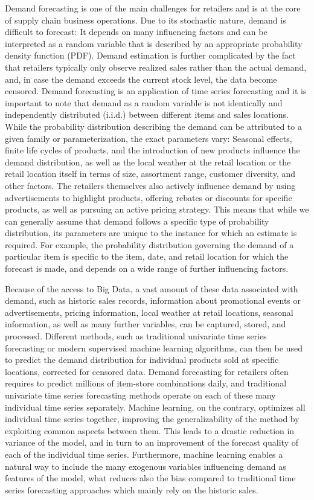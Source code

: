 \documentclass[BCOR=1mm, DIV=calc,10pt,
twoside=true,
twocolumn,
headings=normal]{scrartcl}
\begin{document}
Demand forecasting is one of the main challenges for retailers and is at the core of supply chain business operations. Due to its stochastic nature, demand is difficult to forecast: It depends on many influencing factors and can be interpreted as a random variable that is described by an appropriate probability density function (PDF). Demand estimation is further complicated by the fact that retailers typically only observe realized sales rather than the actual demand, and, in case the demand exceeds the current stock level, the data become censored. Demand forecasting is an application of time series forecasting and it is important to note that demand as a random variable is not identically and independently distributed (i.i.d.) between different items and sales locations. While the probability distribution describing the demand can be attributed to a given family or parameterization, the exact parameters vary: Seasonal effects, finite life cycles of products, and the introduction of new products influence the demand distribution, as well as the local weather at the retail location or the retail location itself in terms of size, assortment range, customer diversity, and other factors. The retailers themselves also actively influence demand by using advertisements to highlight products, offering rebates or discounts for specific products, as well as pursuing an active pricing strategy. This means that while we can generally assume that demand follows a specific type of probability distribution, its parameters are unique to the instance for which an estimate is required. For example, the probability distribution governing the demand of a particular item is specific to the item, date, and retail location for which the forecast is made, and depends on a wide range of further influencing factors.

Because of the access to  Big Data, a vast amount of these data associated with demand, such as historic sales records, information about promotional events or advertisements, pricing information, local weather at retail locations, seasonal information, as well as many further variables, can be captured, stored, and processed. Different methods, such as traditional univariate time series forecasting or modern supervised machine learning algorithms, can then be used to predict the demand distribution for individual products sold at specific locations, corrected for censored data. Demand forecasting for retailers often requires to predict millions of item-store combinations daily, and traditional univariate time series forecasting methods operate on each of these many individual time series separately. Machine learning, on the contrary, optimizes all individual time series together, improving the generalizability of the method by exploiting common aspects between them. This leads to a drastic reduction in variance of the model, and in turn to an improvement of the forecast quality of each of the individual time series. Furthermore, machine learning enables a natural way to include the many exogenous variables influencing demand as features of the model, what reduces also the bias compared to traditional time series forecasting approaches which mainly rely on the historic sales.
\end{document}
